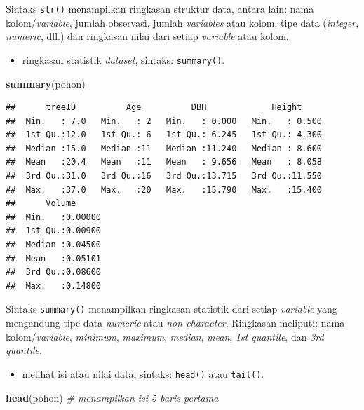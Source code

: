 \documentclass[
  12pt,
  a4paper,
]{scrbook}
\newenvironment{Shaded}{\begin{snugshade}}{\end{snugshade}}
\newcommand{\CommentTok}[1]{\textcolor[rgb]{0.56,0.35,0.01}{\textit{#1}}}
\newcommand{\KeywordTok}[1]{\textcolor[rgb]{0.13,0.29,0.53}{\textbf{#1}}}
\newcommand{\NormalTok}[1]{#1}
\providecommand{\tightlist}{%
  \setlength{\itemsep}{0pt}\setlength{\parskip}{0pt}}
\begin{document}
Sintaks \texttt{str()} menampilkan ringkasan struktur data, antara lain:
nama kolom/\emph{variable}, jumlah observasi, jumlah \emph{variables}
atau kolom, tipe data (\emph{integer}, \emph{numeric}, dll.) dan
ringkasan nilai dari setiap \emph{variable} atau kolom.

\begin{itemize}
\tightlist
\item
  ringkasan statistik \emph{dataset}, sintaks: \texttt{summary()}.
\end{itemize}

\begin{Shaded}
\begin{Highlighting}[]
\KeywordTok{summary}\NormalTok{(pohon)}
\end{Highlighting}
\end{Shaded}

\begin{verbatim}
##      treeID          Age          DBH             Height      
##  Min.   : 7.0   Min.   : 2   Min.   : 0.000   Min.   : 0.500  
##  1st Qu.:12.0   1st Qu.: 6   1st Qu.: 6.245   1st Qu.: 4.300  
##  Median :15.0   Median :11   Median :11.240   Median : 8.600  
##  Mean   :20.4   Mean   :11   Mean   : 9.656   Mean   : 8.058  
##  3rd Qu.:31.0   3rd Qu.:16   3rd Qu.:13.715   3rd Qu.:11.550  
##  Max.   :37.0   Max.   :20   Max.   :15.790   Max.   :15.400  
##      Volume       
##  Min.   :0.00000  
##  1st Qu.:0.00900  
##  Median :0.04500  
##  Mean   :0.05101  
##  3rd Qu.:0.08600  
##  Max.   :0.14800
\end{verbatim}

Sintaks \texttt{summary()} menampilkan ringkasan statistik dari setiap
\emph{variable} yang mengandung tipe data \emph{numeric} atau
\emph{non-character}. Ringkasan meliputi: nama kolom/\emph{variable},
\emph{minimum}, \emph{maximum}, \emph{median}, \emph{mean}, \emph{1st
quantile}, dan \emph{3rd quantile}.

\newpage

\begin{itemize}
\tightlist
\item
  melihat isi atau nilai data, sintaks: \texttt{head()} atau
  \texttt{tail()}.
\end{itemize}

\begin{Shaded}
\begin{Highlighting}[]
\KeywordTok{head}\NormalTok{(pohon)  }\CommentTok{# menampilkan isi 5 baris pertama}
\end{Highlighting}
\end{Shaded}
\end{document}
